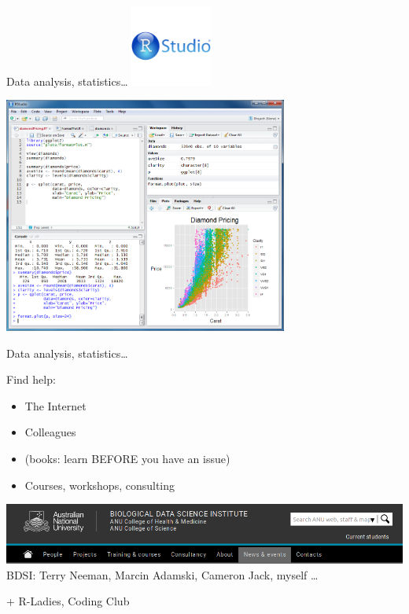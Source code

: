 \documentclass[10pt]{beamer}%
\begin{document}
\begin{frame}{Data analysis, statistics\dots }
\includegraphics[width=0.2\textwidth]{Figures/rsname}
\vspace{-0.5cm}

\centering
\includegraphics[width=0.7\textwidth]{Figures/Rstudio2}
\end{frame}

\begin{frame}{Data analysis, statistics\dots }
    \begin{block}{Find help:}
        \begin{itemize}
         \item The Internet
         \item Colleagues
         \item (books: learn BEFORE you have an issue)
         \item Courses, workshops, consulting
        \end{itemize}
  \pause  
    \includegraphics[width=\textwidth]{Figures/bdsi}
    BDSI: Terry Neeman, Marcin Adamski, Cameron Jack, myself \dots
    \end{block}
\pause
    \alert{\large + R-Ladies, Coding Club}
\end{frame}
\end{document}
